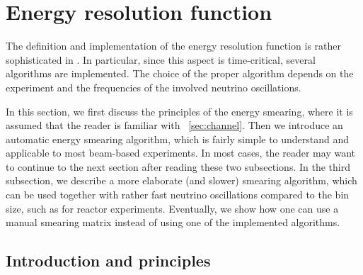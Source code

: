 \section{Energy resolution function}
\label{sec:energy}

The definition and implementation of the energy resolution function is 
rather sophisticated in \GLOBES . In particular, since this aspect is 
 time-critical, several algorithms are implemented. The choice of the 
proper algorithm depends on the experiment and the frequencies of the
 involved neutrino oscillations.

In this section, we first discuss the principles of the energy smearing, where it is assumed that the reader is familiar with \Sec~\ref{sec:channel}. Then we introduce an automatic energy smearing algorithm, which is fairly simple to understand and applicable to most beam-based experiments. 
In most cases, the reader may want to continue to the next section after reading these two subsections. In the third subsection, we describe a more elaborate (and slower) smearing algorithm, which can be used together with rather fast neutrino oscillations compared to the bin size, such as for reactor experiments. Eventually, we show how one can use a manual smearing matrix instead of using one of the implemented algorithms.

\subsection{Introduction and principles}

